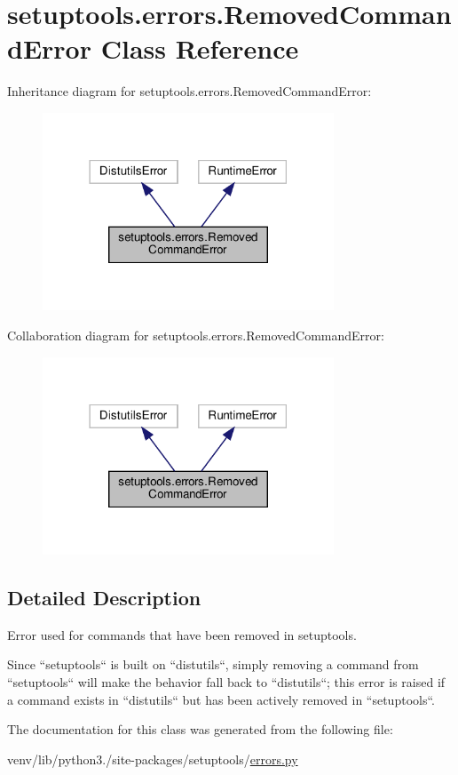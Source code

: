 \hypertarget{classsetuptools_1_1errors_1_1RemovedCommandError}{}\section{setuptools.\+errors.\+Removed\+Command\+Error Class Reference}
\label{classsetuptools_1_1errors_1_1RemovedCommandError}


Inheritance diagram for setuptools.\+errors.\+Removed\+Command\+Error\+:
\nopagebreak
\begin{figure}[H]
\begin{center}
\leavevmode
\includegraphics[width=246pt]{classsetuptools_1_1errors_1_1RemovedCommandError__inherit__graph}
\end{center}
\end{figure}


Collaboration diagram for setuptools.\+errors.\+Removed\+Command\+Error\+:
\nopagebreak
\begin{figure}[H]
\begin{center}
\leavevmode
\includegraphics[width=246pt]{classsetuptools_1_1errors_1_1RemovedCommandError__coll__graph}
\end{center}
\end{figure}


\subsection{Detailed Description}
\begin{DoxyVerb}Error used for commands that have been removed in setuptools.

Since ``setuptools`` is built on ``distutils``, simply removing a command
from ``setuptools`` will make the behavior fall back to ``distutils``; this
error is raised if a command exists in ``distutils`` but has been actively
removed in ``setuptools``.
\end{DoxyVerb}
 

The documentation for this class was generated from the following file\+:\begin{DoxyCompactItemize}
\item 
venv/lib/python3./site-\/packages/setuptools/\hyperlink{errors_8py}{errors.\+py}\end{DoxyCompactItemize}
